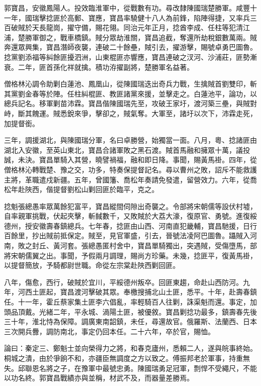 \begin{pinyinscope}
郭寶昌，安徽鳳陽人。投效臨淮軍中，從戰數有功。尋改隸陳國瑞楚勝軍。咸豐十一年，國瑞擊捻匪於高郵、寶應，寶昌率驍健十八人為前鋒，陷陣得捷，又率兵三百破賊於天長龍崗，擢守備，賜花翎。同治元年正月，捻酋李成、任柱等犯清江浦，楚勝軍御之，戰車橋鎮。賊分眾劫淮關，寶昌追截，奪還所劫稅銀數萬兩。賊奔還眾興集，寶昌潛師夜襲，連破二十餘壘，賊引去，擢游擊，賜號卓勇巴圖魯。捻黨劉添福等糾餘匪擾泗洲，山東棍匪亦響應，寶昌連破之汊河、沙浦莊，匪勢漸衰。二年，匪首孫化祥就擒。積功洊擢副將，楚勝軍名益著。

僧格林沁調令助剿白蓮池、鳳凰山，從陳國瑞迭出奇兵力戰，生擒賊首劉雙印，斬其黨劉金春等於陣。任柱糾棍匪、教匪諸黨來援，並擊走之。白蓮池平，論功，以總兵記名。移軍剿苗沛霖。寶昌偕陳國瑞先至，攻破王家圩，渡河築三壘，與賊對峙，斷其餽運。賊悉銳來爭，擊卻之，賊氣奪。大軍至，諸圩以次下，沛霖走死，加提督銜。

三年，調援湖北，與陳國瑞分軍，名曰卓勝營，始獨當一面。八月，粵、捻諸匪由湖北入安徽，至英山東北，寶昌合諸軍敗之黑石渡。賊首馬融和擁眾十萬，議投誠，未決。寶昌單騎入其營，曉譬禍福，融和即日降。事聞，賜黃馬褂。四年，從僧格林沁轉戰楚、豫之交，功多，特奏保提督記名。尋以曹州之敗，詔斥不能救護主將，革職遣戍新疆。五年，曾國籓、喬松年奏請免發遣，留營效力。六年，從喬松年赴陜西，偕提督劉松山剿回匪於臨平，克之。

捻魁張總愚率眾萬餘犯富平，寶昌縱間伺隙出奇襲之。令部將宋朝儒等設伏村墟，自率親軍挑戰，伏起夾擊，斬馘數千，又敗賊於大荔大濠，復原官、勇號。進復綏德州，授安徽壽春鎮總兵。七年春，捻匪由山西、河南直犯畿輔，寶昌馳援，日行百餘里，抄出賊前抵保定。賊至，見官軍盛，引去，晉號法凌阿巴圖魯。躡賊入河南，敗之封丘、黃河套。張總愚匿村舍中，寶昌單騎獨出，突遇賊，受傷墮馬，部將宋朝儒翼之出。事聞，予假兩月調理，賜尚方珍藥。未幾，捻匪平，復黃馬褂，以提督簡放，予騎都尉世職。命從左宗棠赴陜西剿回匪。

八年，傷愈，西行，破賊於宜川，平綏德州叛卒。回匪東趨，命赴山西防河。九年，河西土匪起，寶昌渡河擊破其眾。奉檄搜捕北山土匪，悉平。十年，赴壽春鎮任。十一年，霍丘蔡家集土匪李六倡亂，率輕騎百人往剿，誅渠魁而還。事定，加頭品頂戴。光緒二年，平永城、渦陽土匪，被優敘。寶昌剿捻功最多，鎮壽春先後三十年，淮北恃為保障。調廣東南韶鎮，未任，尋還故官。俄羅斯、法蘭西、日本三次開兵釁，調防南北，事定仍回本任。二十六年，卒於官，賜恤。

論曰：秦定三、鄭魁士並向榮得力之將，和春克廬州，悉賴二人，遂與皖事終始。桐城之潰，由於爭餉不和，亦疆臣無調度之方以致之。傅振邦老於軍事，持重無失。邱聯恩名將之子，在豫軍中最號忠勇。陳國瑞勇足冠軍，剽悍不受繩尺，不能以功名終。郭寶昌戰績亦與並稱，材武不及，而器量差勝焉。


\end{pinyinscope}